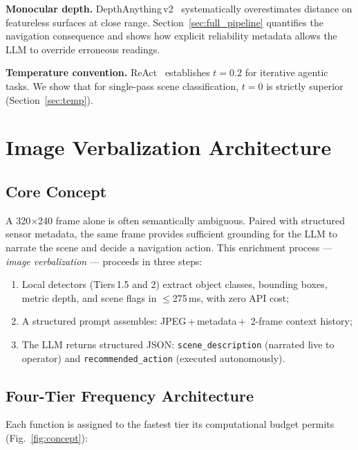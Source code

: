 \documentclass[journal]{IEEEtran}
\begin{document}
\textbf{Monocular depth.}
DepthAnything\,v2~\cite{yang2024depthanythingv2} systematically
overestimates distance on featureless surfaces at close range.
Section~\ref{sec:full_pipeline} quantifies the navigation
consequence and shows how explicit reliability metadata allows the
LLM to override erroneous readings.

\textbf{Temperature convention.}
ReAct~\cite{yao2022react} establishes $t=0.2$ for iterative
agentic tasks.
We show that for single-pass scene classification, $t=0$ is
strictly superior (Section~\ref{sec:temp}).

\section{Image Verbalization Architecture}
\label{sec:arch}

\subsection{Core Concept}

A 320$\times$240 frame alone is often semantically ambiguous.
Paired with structured sensor metadata, the same frame provides
sufficient grounding for the LLM to narrate the scene and decide
a navigation action.
This enrichment process --- \emph{image verbalization} --- proceeds
in three steps:
\begin{enumerate}
  \item Local detectors (Tiers\,1.5 and 2) extract object classes,
    bounding boxes, metric depth, and scene flags in $\leq$275\,ms,
    with zero API cost;
  \item A structured prompt assembles: JPEG\,+\,metadata\,+\,
    2-frame context history;
  \item The LLM returns structured JSON:
    \texttt{scene\_description} (narrated live to operator) and
    \texttt{recommended\_action} (executed autonomously).
\end{enumerate}

\subsection{Four-Tier Frequency Architecture}

Each function is assigned to the fastest tier its computational
budget permits (Fig.~\ref{fig:concept}):
\end{document}
